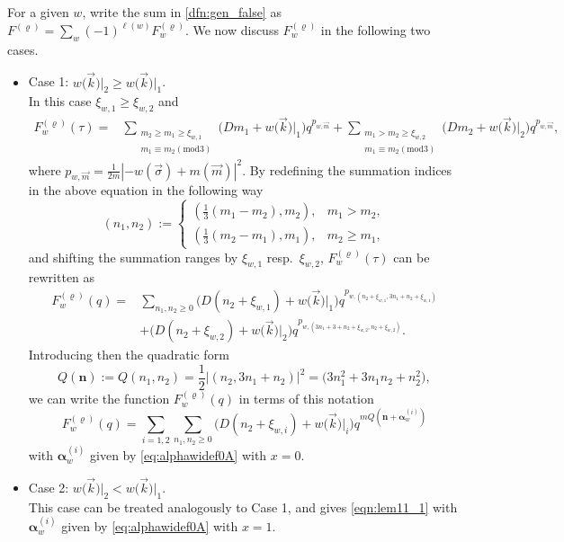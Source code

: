 \documentclass[10pt,a4paper]{amsart}
\def\m{m_\ast}
\def\bon{\mathbf{n}}
\def\bos{\varrho}
\def\bal{\boldsymbol{\alpha}}
\def\bon{\boldsymbol{n}}
\theoremstyle{definition}
\numberwithin{equation}{section}
\begin{document}
For a given $w$, write the sum in \eqref{dfn:gen_false} as $F^{(\bos)} = \sum_w (-1)^{\ell(w)}F^{(\bos)}_w$. We now discuss $F^{(\bos)}_w$ in the following two cases.
\begin{itemize}\itemsep=0pt
	\item
	Case 1: $w\bigl(\vec{k}\bigr)\lvert_2\geq w\bigl(\vec{k}\bigr)\lvert_1$. \\
	In this case $\xi_{w,1}\geq \xi_{w,2}$ and
	\begin{align*}
		F_w^{(\bos)}(\tau) = & \sum_{\substack{m_2\geq m_1\geq \xi_{w,1}\\
				m_1\equiv m_2 (\mathrm{mod}3)}} \bigl(Dm_1 + w\bigl(\vec{k}\bigr)\vert_1\bigr) q^{p_{w,\vec{m}}}
		+ \sum_{\substack{m_1>m_2\geq \xi_{w,2}\\m_1\equiv m_2 (\mathrm{mod} 3)}} \bigl(Dm_2 + w\bigl(\vec{k}\bigr)\vert_2\bigr) q^{p_{w,\vec{m}}},
	\end{align*}
	where ${p_{w,\vec{m}}} = \frac{1}{2m}|-w(\vec\sigma) + m(\vec m)|^2$. By redefining the summation indices in the above equation in the following way
	\begin{equation*}
		\left( n_{1},n_{2} \right):=\begin{cases}
			\left(\frac{1}{3}\left( m_{1}-m_{2} \right),m_{2} \right), & m_{1}> m_{2},\\
			\left(\frac{1}{3}\left( m_{2}-m_{1} \right),m_{1} \right), & m_{2}\ge m_{1},
		\end{cases}
	\end{equation*}
	and shifting the summation ranges by $\xi_{w,1}$ resp.\ $\xi_{w,2}$, $F^{(\bos )}_w(\tau)$ can be rewritten as
	\begin{align*}
		F_w^{(\bos)} (q) ={}& \sum_{n_1,n_2\geq 0}
		\bigl(D(n_2+\xi_{w,1})+w\bigl(\vec{k}\bigr)\vert_1\bigr)q^{p_{w,(n_2+\xi_{w,1},3n_1+n_2+\xi_{w,1})}}
		 \\
		& +
		\bigl(D(n_2+\xi_{w,2})+w\bigl(\vec{k}\bigr)\vert_2\bigr)
		q^{p_{w,(3n_1+3+n_2+\xi_{w,2},n_2+\xi_{w,2})}} .
	\end{align*}
	Introducing then the quadratic form
	\begin{equation*}
		Q(\bon):= Q(n_1,n_2) = \frac{
			1}{2}|(n_2,3n_1+n_2)|^2=
		\bigl(3n_{1}^2+3n_1n_2+n_2^2\bigr),
	\end{equation*}
	we can write the function $F_w^{(\bos)} (q)$ in terms of this notation
	\begin{equation}\label{eqn:lem11_1}
		F^{(\bos)}_w (q)=
		\sum_{i=1,2} \sum_{n_1,n_2\geq 0} \bigl(D(n_2+\xi_{w,i})+w\bigl(\vec{k}\bigr)\vert_i\bigr)q^{mQ(\bon+\bal_w^{(i)})}
	\end{equation}
	with $ \bal_w^{(i)}$ given by \eqref{eq:alphawidef0A} with $x=0$.
	
	\item Case 2: $w\bigl(\vec{k}\bigr)\lvert_2< w\bigl(\vec{k}\bigr)\lvert_1$. \\
	This case can be treated analogously to Case 1, and gives \eqref{eqn:lem11_1} with $\bal_w^{(i)}$ given by \eqref{eq:alphawidef0A} with $x=1$.
\end{itemize}
\end{document}
